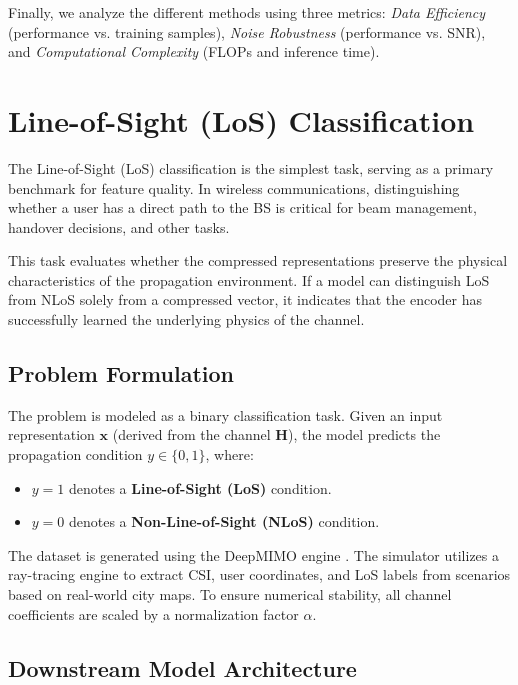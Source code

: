 Finally, we analyze the different methods using three metrics: \textit{Data Efficiency} (performance vs. training samples), \textit{Noise Robustness} (performance vs. SNR), and \textit{Computational Complexity} (FLOPs and inference time).

\section{Line-of-Sight (LoS) Classification}\label{sec:task_los_nlos}

The Line-of-Sight (LoS) classification is the simplest task, serving as a primary benchmark for feature quality. In wireless communications, distinguishing whether a user has a direct path to the BS is critical for beam management, handover decisions, and other tasks. 

This task evaluates whether the compressed representations preserve the physical characteristics of the propagation environment. If a model can distinguish LoS from NLoS solely from a compressed vector, it indicates that the encoder has successfully learned the underlying physics of the channel.

\subsection{Problem Formulation}\label{sec:task_los_nlos_problem}

The problem is modeled as a binary classification task. Given an input representation $\mathbf{x}$ (derived from the channel $\mathbf{H}$), the model predicts the propagation condition $y \in \{0, 1\}$, where:
\begin{itemize}
    \item $y = 1$ denotes a \textbf{Line-of-Sight (LoS)} condition.
    \item $y = 0$ denotes a \textbf{Non-Line-of-Sight (NLoS)} condition.
\end{itemize}

The dataset is generated using the DeepMIMO engine \cite{Alkhateeb2019}. The simulator utilizes a ray-tracing engine to extract CSI, user coordinates, and LoS labels from scenarios based on real-world city maps. To ensure numerical stability, all channel coefficients are scaled by a normalization factor $\alpha$.

\subsection{Downstream Model Architecture}\label{sec:task_los_nlos_model}

